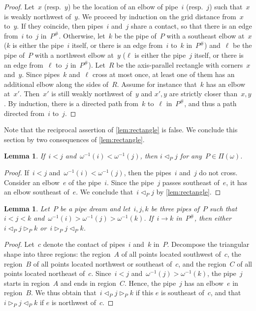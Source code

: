 \documentclass[reqno]{amsart}
\newtheorem{lemma}[theorem]{Lemma}
\theoremstyle{definition}
\newcommand{\pipeDreams}{\Pi} %
\newcommand{\contact}{^\#} %
\newcommand{\less}{\vartriangleleft} %
\newcommand{\more}{\vartriangleright} %
\newcommand{\contactLess}[1]{\less_{#1}} %
\newcommand{\contactMore}[1]{\more_{#1}} %
\begin{document}
\begin{proof}
Let~$x$ (resp.~$y$) be the location of an elbow of pipe~$i$ (resp.~$j$) such that~$x$ is weakly northwest of~$y$.
We proceed by induction on the grid distance from~$x$ to~$y$.
If they coincide, then pipes~$i$ and~$j$ share a contact, so that there is an edge from~$i$ to~$j$ in~$P\contact$.
Otherwise, let~$k$ be the pipe of~$P$ with a southeast elbow at~$x$ ($k$ is either the pipe~$i$ itself, or there is an edge from~$i$ to~$k$ in~$P\contact$) and~$\ell$ be the pipe of~$P$ with a northwest elbow at~$y$ ($\ell$ is either the pipe~$j$ itself, or there is an edge from~$\ell$ to~$j$ in~$P\contact$).
Let~$R$ be the axis-parallel rectangle with corners~$x$ and~$y$.
Since pipes~$k$ and~$\ell$ cross at most once, at least one of them has an additional elbow along the sides of~$R$.
Assume for instance that~$k$ has an elbow at~$x'$.
Then~$x'$ is still weakly northwest of~$y$ and $x',y$ are strictly closer than~$x,y$.
By induction, there is a directed path from~$k$ to~$\ell$ in~$P\contact$, and thus a path directed from~$i$ to~$j$.
\end{proof}

Note that the reciprocal assertion of \cref{lem:rectangle} is false.
We conclude this section by two consequences of \cref{lem:rectangle}.

\begin{lemma}
\label{lem:consequenceRectangle1}
If~$i < j$ and~$\omega^{-1}(i) < \omega^{-1}(j)$, then $i \contactLess{P} j$ for any~$P \in \pipeDreams(\omega)$.
\end{lemma}

\begin{proof}
If~$i < j$ and~$\omega^{-1}(i) < \omega^{-1}(j)$, then the pipes~$i$ and~$j$ do not cross.
Consider an elbow~$e$ of the pipe~$i$.
Since the pipe~$j$ passes southeast of~$e$, it has an elbow southeast of~$e$.
We conclude that~$i \contactLess{P} j$ by \cref{lem:rectangle}.
\end{proof}

\begin{lemma}
\label{lem:consequenceRectangle2}
Let~$P$ be a pipe dream and let~$i,j,k$ be three pipes of~$P$ such that~$i < j < k$ and~$\omega^{-1}(i) > \omega^{-1}(j) > \omega^{-1}(k)$.
If~$i \to k$ in~$P\contact$, then either~$i \contactLess{P} j \contactMore{P} k$ or~$i \contactMore{P} j \contactLess{P} k$.
\end{lemma}

\begin{proof}
Let~$c$ denote the contact of pipes~$i$ and~$k$ in~$P$.
Decompose the triangular shape into three regions: the region~$A$ of all points located southwest of~$c$, the region~$B$ of all points located northwest or southeast of~$c$, and the region~$C$ of all points located northeast of~$c$.
Since~$i < j$ and~$\omega^{-1}(j) > \omega^{-1}(k)$, the pipe~$j$ starts in region~$A$ and ends in region~$C$.
Hence, the pipe~$j$ has an elbow~$e$ in region~$B$.
We thus obtain that~$i \contactLess{P} j \contactMore{P} k$ if this $e$ is southeast of~$c$, and that~$i \contactMore{P} j \contactLess{P} k$ if $e$ is northwest of~$c$.
\end{proof}
\end{document}
